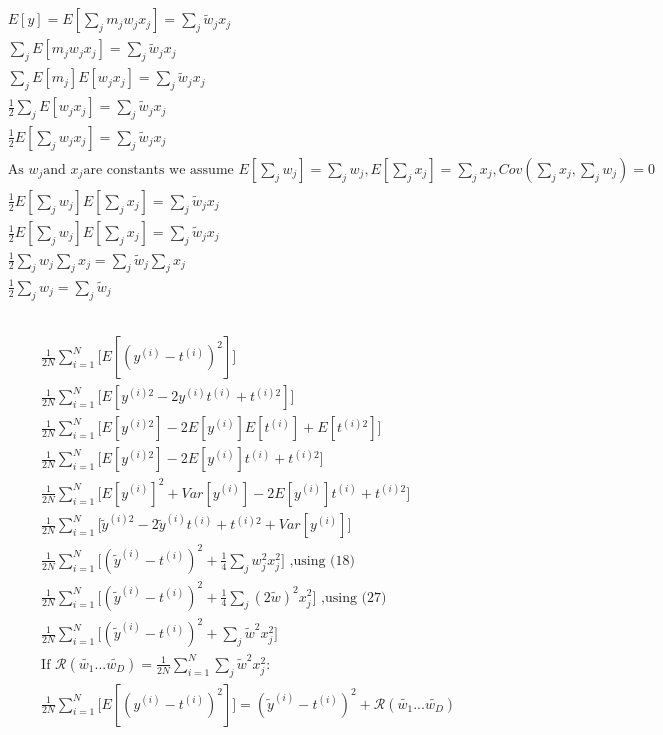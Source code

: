 \documentclass[12pt,letterpaper]{article} %
\newcommand{\sumj}{\sum_j}
\begin{document}
\subsection{}
\begin{align}
&E[y] = E[\sum_j m_jw_jx_j]= \sumj \tilde{w}_jx_j \\
&\sumj E[m_jw_jx_j]= \sumj \tilde{w}_jx_j \\
&\sumj E[m_j]E[w_jx_j]= \sumj \tilde{w}_jx_j \\
&\frac{1}{2}\sumj E[w_jx_j]= \sumj \tilde{w}_jx_j \\
&\frac{1}{2}E[\sumj w_jx_j]= \sumj \tilde{w}_jx_j \\
&\text{As } w_j \text{and } x_j \text{are constants we assume }E[\sumj w_j]=\sumj w_j, E[\sumj x_j]=\sumj x_j, Cov(\sumj x_j,\sumj w_j) = 0\\
&\frac{1}{2}E[\sumj w_j]E[\sumj x_j]= \sumj \tilde{w}_jx_j \\
&\frac{1}{2}E[\sumj w_j]E[\sumj x_j]= \sumj \tilde{w}_jx_j \\
&\frac{1}{2}\sumj w_j\sumj x_j = \sumj \tilde{w}_j \sumj x_j \\
&\frac{1}{2}\sumj w_j = \sumj\tilde{w}_j
\end{align}
\subsection{}
\begin{align}
&\frac{1}{2N}\sum_{i=1}^N\big[E[(y^{(i)}-t^{(i)})^2] \big]\\
&\frac{1}{2N}\sum_{i=1}^N\big[E[y^{(i)2}-2y^{(i)}t^{(i)} + t^{(i)2}] \big]\\
&\frac{1}{2N}\sum_{i=1}^N\big[E[y^{(i) 2}]-2E[y^{(i)}]E[t^{(i)}]+ E[t^{(i) 2}] \big]\\
&\frac{1}{2N}\sum_{i=1}^N\big[E[y^{(i) 2}]-2E[y^{(i)}]t^{(i)}+ t^{(i) 2} \big]\\
&\frac{1}{2N}\sum_{i=1}^N\big[E[y^{(i)}]^ 2+Var[y^{(i)}]-2E[y^{(i)}]t^{(i)}+ t^{(i) 2} \big]\\
&\frac{1}{2N}\sum_{i=1}^N\big[\tilde{y}^{(i) 2}-2\tilde{y}^{(i)}t^{(i)}+ t^{(i) 2} +Var[y^{(i)}] \big]\\
&\frac{1}{2N}\sum_{i=1}^N\big[(\tilde{y}^{(i)}-t^{(i)})^2 + \frac{1}{4}\sumj w_j^2x_j^2 \big] \text{  ,using (18)}\\
&\frac{1}{2N}\sum_{i=1}^N\big[(\tilde{y}^{(i)}-t^{(i)})^2 + \frac{1}{4}\sumj (2\tilde{w})^2x_j^2 \big]\text{  ,using (27)} \\
&\frac{1}{2N}\sum_{i=1}^N\big[(\tilde{y}^{(i)}-t^{(i)})^2 + \sumj \tilde{w}^2x_j^2 \big] \\
&\text{If }\mathcal{R}(\tilde{w_1}...\tilde{w_D}) =\frac{1}{2N}\sum_{i=1}^N \sumj \tilde{w}^2x_j^2:\\
&\frac{1}{2N}\sum_{i=1}^N\big[E[(y^{(i)}-t^{(i)})^2] \big] = (\tilde{y}^{(i)}-t^{(i)})^2 + \mathcal{R}(\tilde{w_1}...\tilde{w_D}) \\
\end{align}
\end{document}
